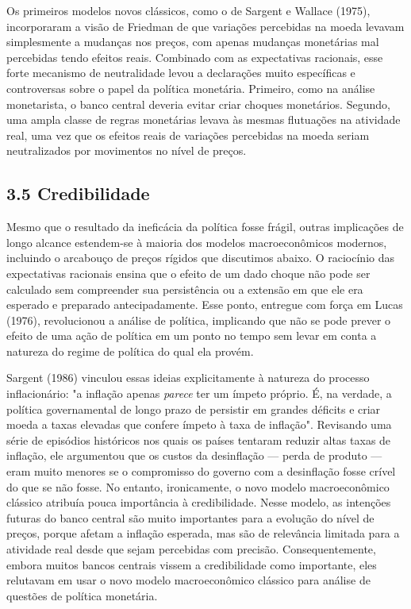 \documentclass[12pt]{article}
\begin{document}
Os primeiros modelos novos clássicos, como o de Sargent e Wallace (1975), incorporaram a visão de Friedman de que variações percebidas na moeda levavam simplesmente a mudanças nos preços, com apenas mudanças monetárias mal percebidas tendo efeitos reais. Combinado com as expectativas racionais, esse forte mecanismo de neutralidade levou a declarações muito específicas e controversas sobre o papel da política monetária. Primeiro, como na análise monetarista, o banco central deveria evitar criar choques monetários. Segundo, uma ampla classe de regras monetárias levava às mesmas flutuações na atividade real, uma vez que os efeitos reais de variações percebidas na moeda seriam neutralizados por movimentos no nível de preços.

\subsection{3.5 Credibilidade}

Mesmo que o resultado da ineficácia da política fosse frágil, outras implicações de longo alcance estendem-se à maioria dos modelos macroeconômicos modernos, incluindo o arcabouço de preços rígidos que discutimos abaixo. O raciocínio das expectativas racionais ensina que o efeito de um dado choque não pode ser calculado sem compreender sua persistência ou a extensão em que ele era esperado e preparado antecipadamente. Esse ponto, entregue com força em Lucas (1976), revolucionou a análise de política, implicando que não se pode prever o efeito de uma ação de política em um ponto no tempo sem levar em conta a natureza do regime de política do qual ela provém.

Sargent (1986) vinculou essas ideias explicitamente à natureza do processo inflacionário: "a inflação apenas \textit{parece} ter um ímpeto próprio. É, na verdade, a política governamental de longo prazo de persistir em grandes déficits e criar moeda a taxas elevadas que confere ímpeto à taxa de inflação". Revisando uma série de episódios históricos nos quais os países tentaram reduzir altas taxas de inflação, ele argumentou que os custos da desinflação — perda de produto — eram muito menores se o compromisso do governo com a desinflação fosse crível do que se não fosse. No entanto, ironicamente, o novo modelo macroeconômico clássico atribuía pouca importância à credibilidade. Nesse modelo, as intenções futuras do banco central são muito importantes para a evolução do nível de preços, porque afetam a inflação esperada, mas são de relevância limitada para a atividade real desde que sejam percebidas com precisão. Consequentemente, embora muitos bancos centrais vissem a credibilidade como importante, eles relutavam em usar o novo modelo macroeconômico clássico para análise de questões de política monetária.
\end{document}
